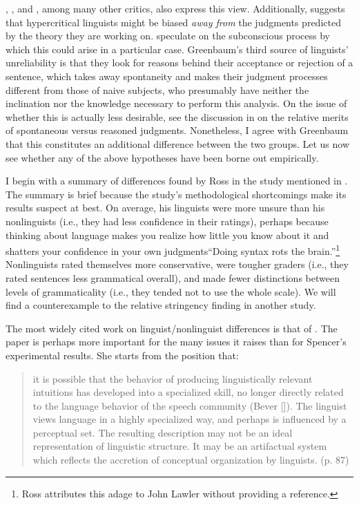  \citet{Botha1973}, \citet{Derwing1973}, \citet{Sampson1975}
 and \citet{Ringen1979}, among many other
critics, also express this view. Additionally, \citet{Levelt1974} suggests that hypercritical linguists might be biased \textit{away from} the judgments predicted by the theory they are working on. \citet{CardenEtAl1981} speculate on the subconscious process by which this could arise in a particular case. Greenbaum's third source of linguists' unreliability is that they look for reasons behind their acceptance or rejection of a sentence, which takes away spontaneity and makes their judgment processes different from those of naive subjects, who presumably have neither the inclination nor the knowledge necessary to perform this analysis. On the issue of whether this is actually less desirable, see the discussion in  on the
relative merits of spontaneous versus reasoned judgments. Nonetheless, I agree with Greenbaum that this constitutes an additional difference between the two groups. Let us now see whether any of the above hypotheses have been borne out empirically.

I begin with a summary of differences found by Ross in the study mentioned in . The summary is brief because the study's methodological shortcomings make its results suspect at best. On average, his linguists were more unsure than his nonlinguists (i.e., they had less confidence in their ratings), perhaps because thinking about language makes you realize how little you know about it and shatters your confidence in your own judgments\schdash{}``Doing syntax rots the brain.''\footnote{Ross attributes this adage to John Lawler without providing a reference.}
 Nonlinguists rated themselves more conservative, were tougher graders (i.e., they rated sentences less grammatical overall), and made fewer distinctions between levels of grammaticality (i.e., they tended not to use the whole scale). We will find a counterexample to the relative stringency finding in another study.

The most widely cited work on linguist/nonlinguist differences is that of \citet{Spencer1973}. The paper is perhaps more important for the many issues it raises than for Spencer's experimental results. She starts from the position that:

\begin{quote}
it is possible that the behavior of producing linguistically relevant intuitions has developed into a specialized skill, no longer directly related to the language behavior of the speech community (Bever [\citeyear{Bever1970a}]).
The linguist views language in a highly specialized way, and perhaps is influenced by a perceptual set. The resulting description may not be an ideal representation of linguistic structure. It may be an artifactual system which reflects the accretion of conceptual organization by linguists. (p. 87)
\end{quote}

